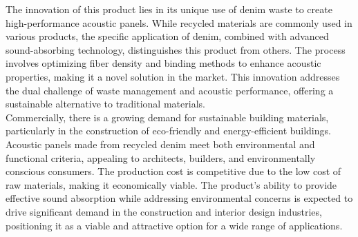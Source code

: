 The innovation of this product lies in its unique use of denim waste to create high-performance acoustic panels. While recycled materials are commonly used in various products, the specific application of denim, combined with advanced sound-absorbing technology, distinguishes this product from others. The process involves optimizing fiber density and binding methods to enhance acoustic properties, making it a novel solution in the market. This innovation addresses the dual challenge of waste management and acoustic performance, offering a sustainable alternative to traditional materials.\\ 

Commercially, there is a growing demand for sustainable building materials, particularly in the construction of eco-friendly and energy-efficient buildings. Acoustic panels made from recycled denim meet both environmental and functional criteria, appealing to architects, builders, and environmentally conscious consumers. The production cost is competitive due to the low cost of raw materials, making it economically viable. The product's ability to provide effective sound absorption while addressing environmental concerns is expected to drive significant demand in the construction and interior design industries, positioning it as a viable and attractive option for a wide range of applications. \\




